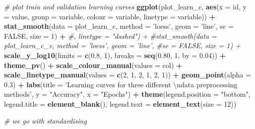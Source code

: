 \documentclass[]{article}
\newenvironment{Shaded}{\begin{snugshade}}{\end{snugshade}}
\newcommand{\CharTok}[1]{\textcolor[rgb]{0.31,0.60,0.02}{#1}}
\newcommand{\CommentTok}[1]{\textcolor[rgb]{0.56,0.35,0.01}{\textit{#1}}}
\newcommand{\DataTypeTok}[1]{\textcolor[rgb]{0.13,0.29,0.53}{#1}}
\newcommand{\DecValTok}[1]{\textcolor[rgb]{0.00,0.00,0.81}{#1}}
\newcommand{\FloatTok}[1]{\textcolor[rgb]{0.00,0.00,0.81}{#1}}
\newcommand{\KeywordTok}[1]{\textcolor[rgb]{0.13,0.29,0.53}{\textbf{#1}}}
\newcommand{\NormalTok}[1]{#1}
\newcommand{\OperatorTok}[1]{\textcolor[rgb]{0.81,0.36,0.00}{\textbf{#1}}}
\newcommand{\OtherTok}[1]{\textcolor[rgb]{0.56,0.35,0.01}{#1}}
\newcommand{\StringTok}[1]{\textcolor[rgb]{0.31,0.60,0.02}{#1}}
\begin{document}
\begin{Shaded}
\begin{Highlighting}[]
{{{{{{\CommentTok{# plot train and validation learning curves}
\KeywordTok{ggplot}\NormalTok{(plot_learn_c, }\KeywordTok{aes}\NormalTok{(}\DataTypeTok{x =}\NormalTok{ id, }\DataTypeTok{y =}\NormalTok{ value, }\DataTypeTok{group =}\NormalTok{ variable, }
                         \DataTypeTok{colour =}\NormalTok{ variable, }\DataTypeTok{linetype =}\NormalTok{ variable)) }\OperatorTok{+}
\StringTok{  }\KeywordTok{stat_smooth}\NormalTok{(}\DataTypeTok{data =}\NormalTok{ plot_learn_c, }\DataTypeTok{method =} \StringTok{'loess'}\NormalTok{, }\DataTypeTok{geom =} \StringTok{'line'}\NormalTok{,}
              \DataTypeTok{se =} \OtherTok{FALSE}\NormalTok{, }\DataTypeTok{size =} \DecValTok{1}\NormalTok{) }\OperatorTok{+}\StringTok{ }\CommentTok{#, linetype = "dashed") +}
\StringTok{  }\CommentTok{#stat_smooth(data = plot_learn_c_v, method = 'loess', geom = 'line', }
\StringTok{              }\CommentTok{#se = FALSE, size = 1) +}
\StringTok{  }\KeywordTok{scale_y_log10}\NormalTok{(}\DataTypeTok{limits =} \KeywordTok{c}\NormalTok{(}\FloatTok{0.8}\NormalTok{, }\DecValTok{1}\NormalTok{), }\DataTypeTok{breaks =} \KeywordTok{seq}\NormalTok{(}\FloatTok{0.80}\NormalTok{, }\DecValTok{1}\NormalTok{, }\DataTypeTok{by =} \FloatTok{0.04}\NormalTok{)) }\OperatorTok{+}
\StringTok{  }\KeywordTok{theme_pv}\NormalTok{() }\OperatorTok{+}
\StringTok{  }\KeywordTok{scale_colour_manual}\NormalTok{(}\DataTypeTok{values =}\NormalTok{ col) }\OperatorTok{+}
\StringTok{  }\KeywordTok{scale_linetype_manual}\NormalTok{(}\DataTypeTok{values =} \KeywordTok{c}\NormalTok{(}\DecValTok{2}\NormalTok{, }\DecValTok{1}\NormalTok{, }\DecValTok{2}\NormalTok{, }\DecValTok{1}\NormalTok{, }\DecValTok{2}\NormalTok{, }\DecValTok{1}\NormalTok{)) }\OperatorTok{+}
\StringTok{  }\KeywordTok{geom_point}\NormalTok{(}\DataTypeTok{alpha =} \FloatTok{0.3}\NormalTok{) }\OperatorTok{+}
\StringTok{  }\KeywordTok{labs}\NormalTok{(}\DataTypeTok{title =} \StringTok{'Learning curves for three different }\CharTok{\textbackslash{}n}\StringTok{data preprocessing methods'}\NormalTok{, }
       \DataTypeTok{y =} \StringTok{"Accuracy"}\NormalTok{, }\DataTypeTok{x =} \StringTok{"Epochs"}\NormalTok{) }\OperatorTok{+}
\StringTok{  }\KeywordTok{theme}\NormalTok{(}\DataTypeTok{legend.position =} \StringTok{"bottom"}\NormalTok{, }
        \DataTypeTok{legend.title =} \KeywordTok{element_blank}\NormalTok{(),}
        \DataTypeTok{legend.text =} \KeywordTok{element_text}\NormalTok{(}\DataTypeTok{size =} \DecValTok{12}\NormalTok{))}

\CommentTok{# we go with standardising}

}}}}}}
\end{Highlighting}
\end{Shaded}
\end{document}

